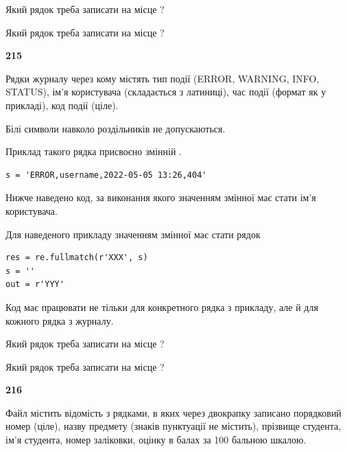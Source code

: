 Який рядок треба записати на місце  ?\par
\vspace{5mm}


Який рядок треба записати на місце  ?\par


\newpage

{\begin {center}\textbf{ 215}\end {center}}\par
Рядки журналу через кому містять тип події (ERROR, WARNING, INFO, STATUS), ім'я користувача (складається з латиниці), час події (фор\-мат як у прикладі), код події (ціле).

Білі символи навколо роздільників не допускаються.

Приклад такого рядка присвоєно змінній .



\begin{verbatim}
s = 'ERROR,username,2022-05-05 13:26,404'
\end{verbatim}


Нижче наведено код, за виконання якого значенням змінної  має стати ім'я користувача.

Для наведеного прикладу значенням змінної  має стати рядок 



\begin{verbatim}
res = re.fullmatch(r'XXX', s)
s = ''
out = r'YYY'
\end{verbatim}


Код має працювати не тільки для конкретного рядка з прикладу, але й для кожного рядка з журналу.




Який рядок треба записати на місце  ?\par
\vspace{5mm}


Який рядок треба записати на місце  ?\par


\newpage

{\begin {center}\textbf{ 216}\end {center}}\par
Файл  містить відомість з рядками, в яких через двокрапку записа\-но поряд\-ковий номер (ціле), назву предмету (знаків пунктуації не містить), прізвище студента, ім'я студента, номер заліковки, оцінку в балах за 100 бальною шкалою.

